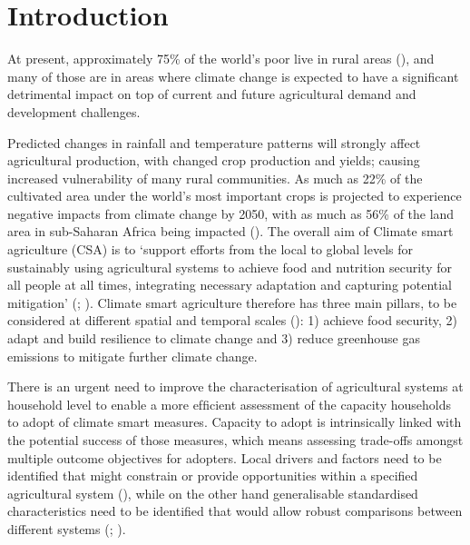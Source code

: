 \newpage



\section{Introduction}

At present, approximately 75\% of the world's poor live in rural areas (\citealp{Livingston2011}), and many of those are in areas where climate change is expected to have a signiﬁcant detrimental impact on top of current and future agricultural demand and development challenges.

Predicted changes in rainfall and temperature patterns will strongly affect agricultural production, with changed crop production and yields; causing increased vulnerability of many rural communities. As much as 22\% of the cultivated area under the world's most important crops is projected to experience negative impacts from climate change by 2050, with as much as 56\% of the land area in sub-Saharan Africa being impacted (\citealp{Campbell2011}). The overall aim of Climate smart agriculture (CSA) is to `support efforts from the local to global levels for sustainably using agricultural systems to achieve food and nutrition security for all people at all times, integrating necessary adaptation and capturing potential mitigation' (\citealp{Lipper20141068}; \citealp{Neufeldt2013}). Climate smart agriculture therefore has three main pillars, to be considered at different spatial and temporal scales (\citealp{FAO2013570}): 1) achieve food security, 2) adapt and build resilience to climate change and 3) reduce greenhouse gas emissions to mitigate further climate change.

There is an urgent need to improve the characterisation of agricultural systems at household level to enable a more efﬁcient assessment of the capacity households to adopt of climate smart measures. Capacity to adopt is intrinsically linked with the potential success of those measures, which means assessing trade-offs amongst multiple outcome objectives for adopters. Local drivers and factors need to be identiﬁed that might constrain or provide opportunities within a speciﬁed agricultural system (\citealp{Carletto2015133}), while on the other hand generalisable standardised characteristics need to be identiﬁed that would allow robust comparisons between different systems (\citealp{Frelat2016458}; \citealp{vanWijk201477}).

